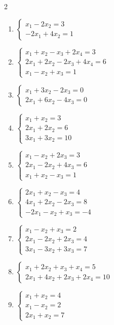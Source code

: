 \begin{multicols}{2}
\begin{enumerate}[label=\arabic*., leftmargin=*]
\item $\begin{cases}x_1-2x_2=3\\-2x_1+4x_2=1\end{cases}$

\item $\begin{cases}x_1+x_2-x_3+2x_4=3\\2x_1+2x_2-2x_3+4x_4=6\\x_1-x_2+x_3=1\end{cases}$

\item $\begin{cases}x_1+3x_2-2x_3=0\\2x_1+6x_2-4x_3=0\end{cases}$

\item $\begin{cases}x_1+x_2=3\\2x_1+2x_2=6\\3x_1+3x_2=10\end{cases}$

\item $\begin{cases}x_1-x_2+2x_3=3\\2x_1-2x_2+4x_3=6\\x_1+x_2-x_3=1\end{cases}$

\item $\begin{cases}2x_1+x_2-x_3=4\\4x_1+2x_2-2x_3=8\\-2x_1-x_2+x_3=-4\end{cases}$

\item $\begin{cases}x_1-x_2+x_3=2\\2x_1-2x_2+2x_3=4\\3x_1-3x_2+3x_3=7\end{cases}$

\item $\begin{cases}x_1+2x_2+x_3+x_4=5\\2x_1+4x_2+2x_3+2x_4=10\end{cases}$

\item $\begin{cases}x_1+x_2=4\\x_1-x_2=2\\2x_1+x_2=7\end{cases}$


\end{enumerate}
\end{multicols}
